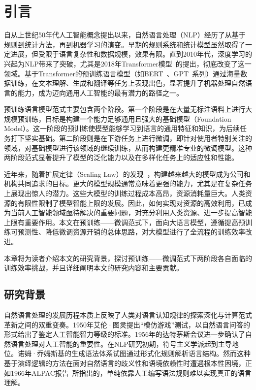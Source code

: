 
\chapter{引言}

自从上世纪50年代人工智能概念提出以来，自然语言处理（NLP）经历了从基于规则到统计方法，再到机器学习的演变。早期的规则系统和统计模型虽然取得了一定进展，但受限于语言复杂性和数据规模，效果有限。直到2010年代，深度学习的兴起为NLP带来了突破，尤其是2018年Transformer模型~\cite{Vaswani+2017}的提出，彻底改变了这一领域。基于Transformer的预训练语言模型（如BERT~\cite{devlin2018bert}、GPT~\cite{radford2018improving}系列）通过海量数据训练，在文本理解、生成和翻译等任务上表现出色，显著提升了机器处理自然语言的能力，成为迈向通用人工智能的最有潜力的路径之一。


预训练语言模型范式主要包含两个阶段。第一个阶段是在大量无标注语料上进行大规模预训练，目标是构建一个能力足够通用且强大的基础模型（Foundation Model）。这一阶段的预训练使模型能够学习到语言的通用特征和知识，为后续任务打下坚实基础。第二阶段则是在下游任务上进行微调，即针对使用者特别关注的领域，对基础模型进行该领域的继续训练，从而构建更精准专业的微调模型。这种两阶段范式显著提升了模型的泛化能力以及在多样化任务上的适应性和性能。

近年来，随着扩展定律（Scaling Law）的发现~\cite{kaplan2020scaling}，构建越来越大的模型成为公司和机构共同追求的目标。更大的模型规模通常意味着更强的能力，尤其是在复杂任务上展现出惊人的潜力。这些大模型的训练过程成本高昂，资源消耗量巨大。人类资源的有限性限制了模型智能上限的发展。因此，如何实现对资源的高效利用，已成为当前人工智能领域亟待解决的重要问题，对充分利用人类资源、进一步提高智能上限有重要作用。本文在预训练——微调范式下，面向大语言模型，遵循提高预训练可预测性、降低微调资源开销的总体思路，对大模型进行了全流程的训练效率改进。

本章将为读者介绍本文的研究背景，探讨预训练——微调范式下两阶段各自面临的训练效率挑战，并且详细阐明本文的研究内容和主要贡献。


\section{研究背景}

自然语言处理的发展历程本质上反映了人类对语言认知规律的探索深化与计算范式革新之间的双重变奏。1950年艾伦·图灵提出“模仿游戏”测试，以自然语言问答的形式给出了鉴定人工智能智力等级的标准。1956年的达特茅斯会议进一步确认了自然语言处理对人工智能的重要性。在NLP研究初期，符号主义学派起到主导地位。诺姆·乔姆斯基的生成语法体系试图通过形式化规则解析语言结构。然而这种基于演绎逻辑的方法在面对自然语言的歧义性和语境依赖性时遭遇根本性困境，正如1966年ALPAC报告~\cite{ALPAC}所指出的，单纯依靠人工编写语法规则难以实现真正的语言理解。


